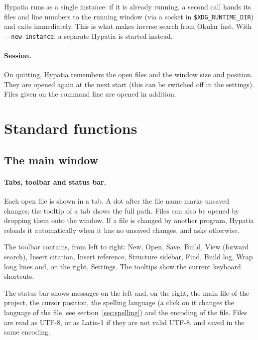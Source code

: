 \documentclass[11pt]{article}
\begin{document}
    Hypatia runs as a single instance: if it is already running, a second call hands its files and line numbers to the running window (via a socket in \verb+$XDG_RUNTIME_DIR+) and exits immediately. This is what makes inverse search from Okular fast. With \verb+--new-instance+, a separate Hypatia is started instead.

    \paragraph{Session.}     On quitting, Hypatia remembers the open files and the window size and position. They are opened again at the next start (this can be switched off in the settings). Files given on the command line are opened in addition.


    \section{Standard functions}

    \subsection{The main window}

    \paragraph{Tabs, toolbar and status bar.}     Each open file is shown in a tab. A dot after the file name marks unsaved changes; the tooltip of a tab shows the full path. Files can also be opened by dropping them onto the window. If a file is changed by another program, Hypatia reloads it automatically when it has no unsaved changes, and asks otherwise.

    The toolbar contains, from left to right: New, Open, Save, Build, View (forward search), Insert citation, Insert reference, Structure sidebar, Find, Build log, Wrap long lines and, on the right, Settings. The tooltips show the current keyboard shortcuts.

    The status bar shows messages on the left and, on the right, the main file of the project, the cursor position, the spelling language (a click on it changes the language of the file, see section~\ref{sec:spelling}) and the encoding of the file. Files are read as UTF-8, or as Latin-1 if they are not valid UTF-8, and saved in the same encoding.
\end{document}
